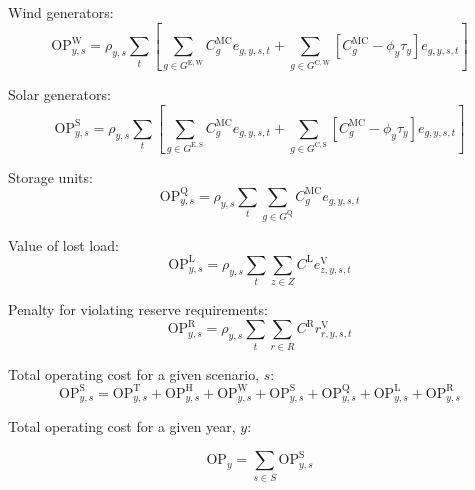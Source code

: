 \documentclass{article}
\newcommand{\sGeneratorsExistingWind}{G^{\mathrm{E,W}}}
\newcommand{\sGeneratorsExistingSolar}{G^{\mathrm{E,S}}}
\newcommand{\sGeneratorsCandidateWind}{G^{\mathrm{C,W}}}
\newcommand{\sGeneratorsCandidateSolar}{G^{\mathrm{C,S}}}
\newcommand{\sStorage}{G^{\mathrm{Q}}}
\newcommand{\sScenarios}{S}
\newcommand{\sZones}{Z}
\newcommand{\sRegions}{R}
\newcommand{\sScenariosYear}{\sScenarios_{\iYear}}
\newcommand{\iGenerator}{g}
\newcommand{\iYear}{y}
\newcommand{\iScenario}{s}
\newcommand{\iInterval}{t}
\newcommand{\iZone}{z}
\newcommand{\iRegion}{r}
\newcommand{\cOperatingCost}[1][\iYear,\iScenario]{\mathrm{OP}_{#1}}
\newcommand{\cOperatingCostThermal}[1][\iYear,\iScenario]{\mathrm{OP}^{\mathrm{T}}_{#1}}
\newcommand{\cOperatingCostHydro}[1][\iYear,\iScenario]{\mathrm{OP}^{\mathrm{H}}_{#1}}
\newcommand{\cOperatingCostWind}[1][\iYear,\iScenario]{\mathrm{OP}^{\mathrm{W}}_{#1}}
\newcommand{\cOperatingCostSolar}[1][\iYear,\iScenario]{\mathrm{OP}^{\mathrm{S}}_{#1}}
\newcommand{\cOperatingCostStorage}[1][\iYear,\iScenario]{\mathrm{OP}^{\mathrm{Q}}_{#1}}
\newcommand{\cScenarioDuration}[1][\iYear,\iScenario]{\rho_{#1}}
\newcommand{\cMarginalCost}[1][\iGenerator,\iYear]{C^{\mathrm{MC}}_{#1}}
\newcommand{\cOperatingCostLostLoad}[1][\iYear,\iScenario]{\mathrm{OP}^{\mathrm{L}}_{#1}}
\newcommand{\cLostLoadCost}{C^{\mathrm{L}}}
\newcommand{\cReserveUpViolationPenalty}{C^{\mathrm{R}}}
\newcommand{\cOperatingCostReserveUpViolation}[1][\iYear,\iScenario]{\mathrm{OP}^{\mathrm{R}}_{#1}}
\newcommand{\cOperatingCostScenario}[1][\iYear,\iScenario]{\mathrm{OP}^{\mathrm{\sScenarios}}_{#1}}
\newcommand{\vBaseline}[1][\iYear]{\phi_{#1}}
\newcommand{\vPermitPrice}[1][\iYear]{\tau_{#1}}
\newcommand{\vEnergy}[1][\iGenerator,\iYear,\iScenario,\iInterval]{e_{#1}}
\newcommand{\vReserveUpViolation}[1][\iRegion,\iYear,\iScenario,\iInterval]{r^{\mathrm{V}}_{#1}}
\newcommand{\vLostLoadEnergy}[1][\iZone,\iYear,\iScenario,\iInterval]{e^{\mathrm{V}}_{#1}}
\begin{document}
Wind generators:
\begin{equation}
	\cOperatingCostWind = \cScenarioDuration\sum\limits_{\iInterval}\left[\sum\limits_{\iGenerator \in \sGeneratorsExistingWind} \cMarginalCost[\iGenerator] \vEnergy + \sum\limits_{\iGenerator \in \sGeneratorsCandidateWind} \left[\cMarginalCost[\iGenerator] - \vBaseline \vPermitPrice\right] \vEnergy\right]
\end{equation}

Solar generators:
\begin{equation}
	\cOperatingCostSolar = \cScenarioDuration \sum\limits_{\iInterval}\left[\sum\limits_{\iGenerator \in \sGeneratorsExistingSolar} \cMarginalCost[\iGenerator] \vEnergy + \sum\limits_{\iGenerator \in \sGeneratorsCandidateSolar} \left[\cMarginalCost[\iGenerator] - \vBaseline\vPermitPrice\right] \vEnergy\right]
\end{equation}

Storage units:
\begin{equation}
	\cOperatingCostStorage = \cScenarioDuration\sum\limits_{\iInterval}\sum\limits_{\iGenerator \in \sStorage} \cMarginalCost[\iGenerator] \vEnergy
\end{equation}

Value of lost load:
\begin{equation}
	\cOperatingCostLostLoad = \cScenarioDuration\sum\limits_{\iInterval}\sum\limits_{\iZone \in \sZones} \cLostLoadCost \vLostLoadEnergy
\end{equation}

Penalty for violating reserve requirements:
\begin{equation}
	\cOperatingCostReserveUpViolation = \cScenarioDuration\sum\limits_{\iInterval}\sum\limits_{\iRegion \in \sRegions} \cReserveUpViolationPenalty \vReserveUpViolation
\end{equation}

Total operating cost for a given scenario, $\iScenario$:
\begin{equation}
	\cOperatingCostScenario = \cOperatingCostThermal + \cOperatingCostHydro + \cOperatingCostWind + \cOperatingCostSolar + \cOperatingCostStorage + \cOperatingCostLostLoad + \cOperatingCostReserveUpViolation
\end{equation}

Total operating cost for a given year, $\iYear$:

\begin{equation}
	\cOperatingCost[\iYear] = \sum\limits_{\iScenario \in \sScenarios} \cOperatingCostScenario
\end{equation}
\end{document}
